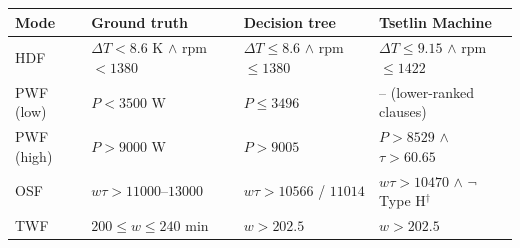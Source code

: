 \begin{tabular}{llll}
\toprule
Mode & Ground truth & Decision tree & Tsetlin Machine \\
\midrule
HDF & $\Delta T < 8.6$ K $\wedge$ rpm $< 1380$ & $\Delta T \le 8.6$ $\wedge$ rpm $\le 1380$ & $\Delta T \le 9.15$ $\wedge$ rpm $\le 1422$ \\
PWF (low) & $P < 3500$ W & $P \le 3496$ & -- (lower-ranked clauses) \\
PWF (high) & $P > 9000$ W & $P > 9005$ & $P > 8529$ $\wedge$ $\tau > 60.65$ \\
OSF & $w\tau > 11000$--$13000$ & $w\tau > 10566$ / $11014$ & $w\tau > 10470$ $\wedge$ $\neg$Type H$^\dagger$ \\
TWF & $200 \le w \le 240$ min & $w > 202.5$ & $w > 202.5$ \\
\bottomrule
\end{tabular}